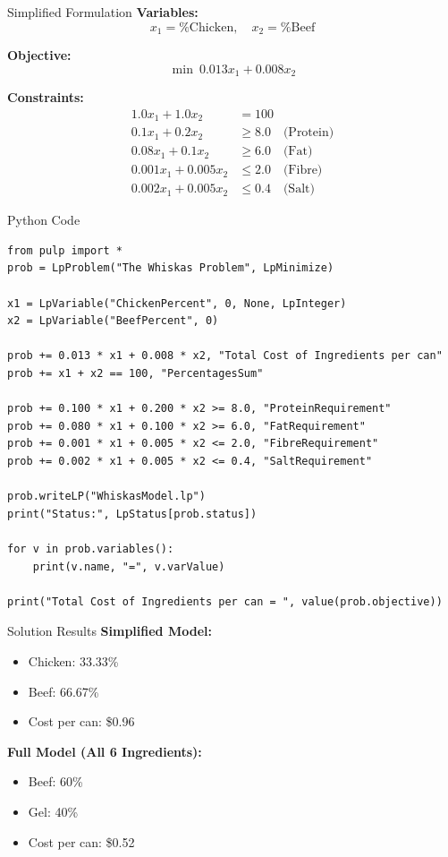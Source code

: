 \documentclass{purdue-slide}
\begin{document}
\begin{frame}{Simplified Formulation}
	\textbf{Variables:}
	\[
		x_1 = \% \text{Chicken}, \quad x_2 = \% \text{Beef}
	\]

	\textbf{Objective:}
	\[
		\min\ 0.013x_1 + 0.008x_2
	\]

	\textbf{Constraints:}
	\begin{align*}
		1.0x_1 + 1.0x_2 &= 100 \\
		0.1x_1 + 0.2x_2 &\ge 8.0 \quad \text{(Protein)} \\
		0.08x_1 + 0.1x_2 &\ge 6.0 \quad \text{(Fat)} \\
		0.001x_1 + 0.005x_2 &\le 2.0 \quad \text{(Fibre)} \\
		0.002x_1 + 0.005x_2 &\le 0.4 \quad \text{(Salt)}
	\end{align*}
\end{frame}

\begin{frame}[fragile]{Python Code}

	\begin{verbatim}
from pulp import *
prob = LpProblem("The Whiskas Problem", LpMinimize)

x1 = LpVariable("ChickenPercent", 0, None, LpInteger)
x2 = LpVariable("BeefPercent", 0)

prob += 0.013 * x1 + 0.008 * x2, "Total Cost of Ingredients per can"
prob += x1 + x2 == 100, "PercentagesSum"

prob += 0.100 * x1 + 0.200 * x2 >= 8.0, "ProteinRequirement"
prob += 0.080 * x1 + 0.100 * x2 >= 6.0, "FatRequirement"
prob += 0.001 * x1 + 0.005 * x2 <= 2.0, "FibreRequirement"
prob += 0.002 * x1 + 0.005 * x2 <= 0.4, "SaltRequirement"

prob.writeLP("WhiskasModel.lp")
print("Status:", LpStatus[prob.status])

for v in prob.variables():
	print(v.name, "=", v.varValue)

print("Total Cost of Ingredients per can = ", value(prob.objective))
\end{verbatim}

\end{frame}

\begin{frame}{Solution Results}
	\textbf{Simplified Model:}
	\begin{itemize}
		\item Chicken: 33.33\%
		\item Beef: 66.67\%
		\item Cost per can: \$0.96
	\end{itemize}

	\bigskip

	\textbf{Full Model (All 6 Ingredients):}
	\begin{itemize}
		\item Beef: 60\%
		\item Gel: 40\%
		\item Cost per can: \$0.52
	\end{itemize}
\end{frame}
\end{document}
